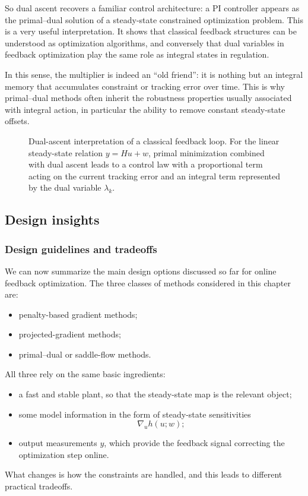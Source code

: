 So dual ascent recovers a familiar control architecture: a PI controller appears as the primal--dual solution of a steady-state constrained optimization problem. This is a very useful interpretation. It shows that classical feedback structures can be understood as optimization algorithms, and conversely that dual variables in feedback optimization play the same role as integral states in regulation.

In this sense, the multiplier is indeed an ``old friend'': it is nothing but an integral memory that accumulates constraint or tracking error over time. This is why primal--dual methods often inherit the robustness properties usually associated with integral action, in particular the ability to remove constant steady-state offsets.

\begin{figure}[!h]
    \centering
    
    \caption{Dual-ascent interpretation of a classical feedback loop. For the linear steady-state relation $y=Hu+w$, primal minimization combined with dual ascent leads to a control law with a proportional term acting on the current tracking error and an integral term represented by the dual variable $\lambda_k$.}
    \label{fig:dual-ascent-pi}
\end{figure}

\subsection{Design insights}
\subsubsection{Design guidelines and tradeoffs}

We can now summarize the main design options discussed so far for online feedback optimization. The three classes of methods considered in this chapter are:
\begin{itemize}
    \item penalty-based gradient methods;
    \item projected-gradient methods;
    \item primal--dual or saddle-flow methods.
\end{itemize}
All three rely on the same basic ingredients:
\begin{itemize}
    \item a fast and stable plant, so that the steady-state map is the relevant object;
    \item some model information in the form of steady-state sensitivities
    \[
    \nabla_u h(u;w);
    \]
    \item output measurements $y$, which provide the feedback signal correcting the optimization step online.
\end{itemize}
What changes is how the constraints are handled, and this leads to different practical tradeoffs.

